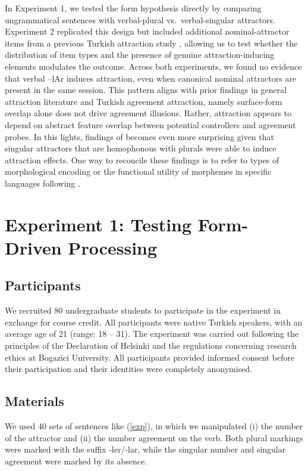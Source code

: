 \documentclass[
  authoryear,
  3p]{elsarticle}
\begin{document}
In Experiment 1, we tested the form hypothesis directly by comparing
ungrammatical sentences with verbal-plural vs.~verbal-singular
attractors. Experiment 2 replicated this design but included additional
nominal-attractor items from a previous Turkish attraction study
\citep{TurkLogacev2024}, allowing us to test whether the distribution of
item types and the presence of genuine attraction-inducing elements
modulates the outcome. Across both experiments, we found no evidence
that verbal --lAr induces attraction, even when canonical nominal
attractors are present in the same session. This pattern aligns with
prior findings in general attraction literature and Turkish agreement
attraction, namely surface-form overlap alone does not drive agreement
illusions. Rather, attraction appears to depend on abstract feature
overlap between potential controllers and agreement probes. In this
lights, findings of \citet{Slioussar2018} becomes even more surprising
given that singular attractors that are homophonous with plurals were
able to induce attraction effects. One way to reconcile these findings
is to refer to types of morphological encoding or the functional utility
of morphemes in specific languages following \citet{DillonKeshev2024}.

\section{Experiment 1: Testing Form-Driven
Processing}\label{experiment-1-testing-form-driven-processing}

\subsection{Participants}\label{participants}

We recruited 80 undergraduate students to participate in the experiment
in exchange for course credit. All participants were native Turkish
speakers, with an average age of 21 (range: 18 -- 31). The experiment
was carried out following the principles of the Declaration of Helsinki
and the regulations concerning research ethics at Bogazici University.
All participants provided informed consent before their participation
and their identities were completely anonymised.

\subsection{Materials}\label{materials}

We used 40 sets of sentences like (\ref{exp}), in which we manipulated
(i) the number of the attractor and (ii) the number agreement on the
verb. Both plural markings were marked with the suffix -ler/-lar, while
the singular number and singular agreement were marked by its absence.
\end{document}
